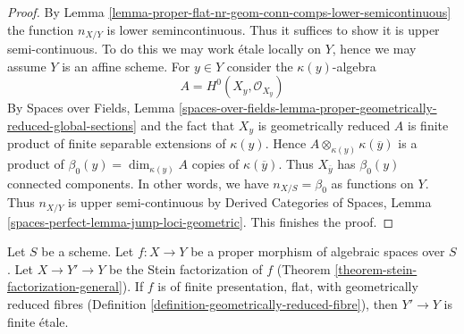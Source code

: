 \begin{proof}
By Lemma \ref{lemma-proper-flat-nr-geom-conn-comps-lower-semicontinuous}
the function $n_{X/Y}$ is lower semincontinuous.
Thus it suffices to show it is upper semi-continuous.
To do this we may work \'etale locally on $Y$, hence we
may assume $Y$ is an affine scheme.
For $y \in Y$ consider the $\kappa(y)$-algebra
$$
A = H^0(X_y, \mathcal{O}_{X_y})
$$
By Spaces over Fields, Lemma
\ref{spaces-over-fields-lemma-proper-geometrically-reduced-global-sections}
and the fact that $X_y$ is geometrically reduced
$A$ is finite product of finite separable extensions of $\kappa(y)$.
Hence $A \otimes_{\kappa(y)} \kappa(\overline{y})$ is a product
of $\beta_0(y) = \dim_{\kappa(y)} A$ copies of $\kappa(\overline{y})$.
Thus $X_{\overline{y}}$ has $\beta_0(y)$ connected components.
In other words, we have $n_{X/S} = \beta_0$ as functions on $Y$.
Thus $n_{X/Y}$ is upper semi-continuous by
Derived Categories of Spaces, Lemma
\ref{spaces-perfect-lemma-jump-loci-geometric}.
This finishes the proof.
\end{proof}

\begin{lemma}
\label{lemma-stein-factorization-etale}
Let $S$ be a scheme.
Let $f : X \to Y$ be a proper morphism of algebraic spaces over $S$.
Let $X \to Y' \to Y$ be the Stein factorization of $f$
(Theorem \ref{theorem-stein-factorization-general}).
If $f$ is of finite presentation, flat, with geometrically
reduced fibres (Definition \ref{definition-geometrically-reduced-fibre}),
then $Y' \to Y$ is finite \'etale.
\end{lemma}

